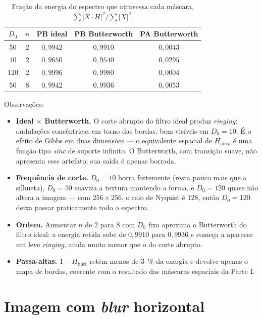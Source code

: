 \documentclass[11pt,a4paper]{article}
\begin{document}
\begin{table}[H]
\centering
\caption{Fração da energia do espectro que atravessa cada máscara,
$\sum |X\cdot H|^2 / \sum |X|^2$.}
\begin{tabular}{ccccc}
\toprule
$D_0$ & $n$ & \textbf{PB ideal} & \textbf{PB Butterworth} & \textbf{PA Butterworth} \\
\midrule
$50$  & $2$ & $0{,}9942$ & $0{,}9910$ & $0{,}0043$ \\
$10$  & $2$ & $0{,}9650$ & $0{,}9540$ & $0{,}0295$ \\
$120$ & $2$ & $0{,}9996$ & $0{,}9980$ & $0{,}0004$ \\
$50$  & $8$ & $0{,}9942$ & $0{,}9936$ & $0{,}0053$ \\
\bottomrule
\end{tabular}
\end{table}

Observações:

\begin{itemize}\itemsep0pt
  \item \textbf{Ideal $\times$ Butterworth.} O corte abrupto do filtro ideal produz
        \emph{ringing}: ondulações concêntricas em torno das bordas, bem visíveis em
        $D_0=10$. É o efeito de Gibbs em duas dimensões --- o equivalente espacial de
        $H_{\text{ideal}}$ é uma função tipo \emph{sinc} de suporte infinito. O
        Butterworth, com transição suave, não apresenta esse artefato; sua saída é
        apenas borrada.
  \item \textbf{Frequência de corte.} $D_0=10$ borra fortemente (resta pouco mais que a
        silhueta), $D_0=50$ suaviza a textura mantendo a forma, e $D_0=120$ quase não
        altera a imagem --- com $256\times256$, o raio de Nyquist é $128$, então
        $D_0=120$ deixa passar praticamente todo o espectro.
  \item \textbf{Ordem.} Aumentar $n$ de $2$ para $8$ com $D_0$ fixo aproxima o
        Butterworth do filtro ideal: a energia retida sobe de $0{,}9910$ para $0{,}9936$
        e começa a aparecer um leve \emph{ringing}, ainda muito menor que o do corte
        abrupto.
  \item \textbf{Passa-altas.} $1 - H_{\text{butt}}$ retém menos de \SI{3}{\percent} da
        energia e devolve apenas o mapa de bordas, coerente com o resultado das máscaras
        espaciais da Parte I.
\end{itemize}

\section{Imagem com \emph{blur} horizontal}
\end{document}
